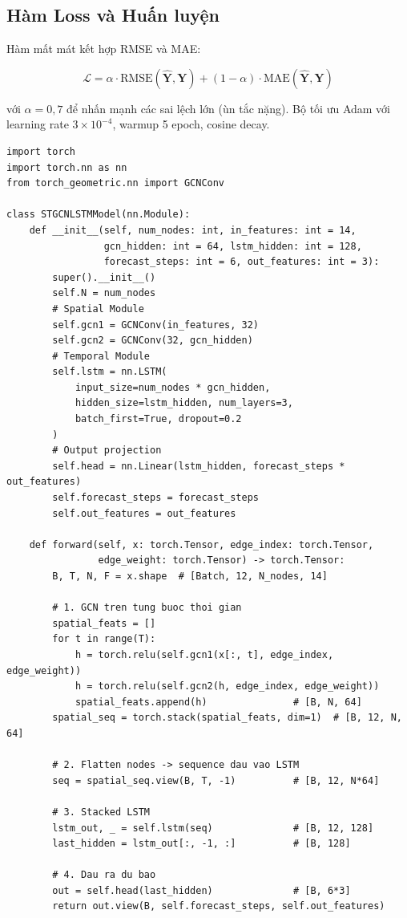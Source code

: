 \subsection{Hàm Loss và Huấn luyện}

Hàm mất mát kết hợp RMSE và MAE:

\begin{equation}
  \mathcal{L} = \alpha \cdot \text{RMSE}(\hat{\mathbf{Y}}, \mathbf{Y}) + (1-\alpha) \cdot \text{MAE}(\hat{\mathbf{Y}}, \mathbf{Y})
  \label{eq:loss}
\end{equation}

với $\alpha = 0{,}7$ để nhấn mạnh các sai lệch lớn (ùn tắc nặng). Bộ tối ưu Adam với learning rate $3 \times 10^{-4}$, warmup 5 epoch, cosine decay.

\begin{lstlisting}[caption={Huấn luyện STGCN+LSTM với PyTorch (trích)},label={lst:training}]
import torch
import torch.nn as nn
from torch_geometric.nn import GCNConv

class STGCNLSTMModel(nn.Module):
    def __init__(self, num_nodes: int, in_features: int = 14,
                 gcn_hidden: int = 64, lstm_hidden: int = 128,
                 forecast_steps: int = 6, out_features: int = 3):
        super().__init__()
        self.N = num_nodes
        # Spatial Module
        self.gcn1 = GCNConv(in_features, 32)
        self.gcn2 = GCNConv(32, gcn_hidden)
        # Temporal Module
        self.lstm = nn.LSTM(
            input_size=num_nodes * gcn_hidden,
            hidden_size=lstm_hidden, num_layers=3,
            batch_first=True, dropout=0.2
        )
        # Output projection
        self.head = nn.Linear(lstm_hidden, forecast_steps * out_features)
        self.forecast_steps = forecast_steps
        self.out_features = out_features

    def forward(self, x: torch.Tensor, edge_index: torch.Tensor,
                edge_weight: torch.Tensor) -> torch.Tensor:
        B, T, N, F = x.shape  # [Batch, 12, N_nodes, 14]

        # 1. GCN tren tung buoc thoi gian
        spatial_feats = []
        for t in range(T):
            h = torch.relu(self.gcn1(x[:, t], edge_index, edge_weight))
            h = torch.relu(self.gcn2(h, edge_index, edge_weight))
            spatial_feats.append(h)               # [B, N, 64]
        spatial_seq = torch.stack(spatial_feats, dim=1)  # [B, 12, N, 64]

        # 2. Flatten nodes -> sequence dau vao LSTM
        seq = spatial_seq.view(B, T, -1)          # [B, 12, N*64]

        # 3. Stacked LSTM
        lstm_out, _ = self.lstm(seq)              # [B, 12, 128]
        last_hidden = lstm_out[:, -1, :]          # [B, 128]

        # 4. Dau ra du bao
        out = self.head(last_hidden)              # [B, 6*3]
        return out.view(B, self.forecast_steps, self.out_features)
\end{lstlisting}

